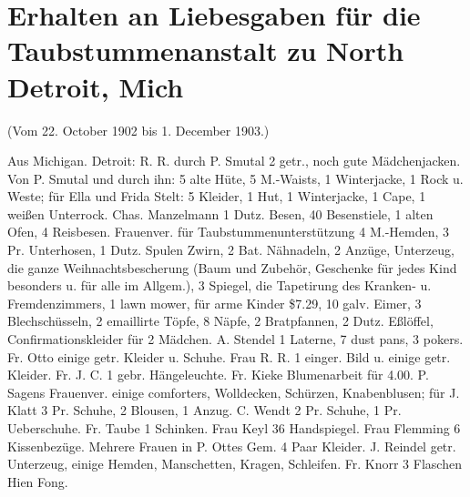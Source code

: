 \chapter[Liebesgaben für die Taubstummenanstalt]{Erhalten an Liebesgaben für die Taubstummenanstalt zu North Detroit, Mich}

(Vom 22. October 1902 bis 1. December 1903.)

Aus Michigan. Detroit: R. R. durch P. Smutal 2 getr., noch gute Mädchenjacken. Von P. Smutal und durch ihn: 5 alte Hüte, 5 M.-Waists, 1 Winterjacke, 1 Rock u. Weste; für Ella und Frida Stelt: 5 Kleider, 1 Hut, 1 Winterjacke, 1 Cape, 1 weißen Unterrock. Chas. Manzelmann 1 Dutz. Besen, 40 Besenstiele, 1 alten Ofen, 4 Reisbesen. Frauenver. für Taubstummenunterstützung 4 M.-Hemden, 3 Pr. Unterhosen, 1 Dutz. Spulen Zwirn, 2 Bat. Nähnadeln, 2 Anzüge, Unterzeug, die ganze Weihnachtsbescherung (Baum und Zubehör, Geschenke für jedes Kind besonders u. für alle im Allgem.), 3 Spiegel, die Tapetirung des Kranken- u. Fremdenzimmers, 1 lawn mower, für arme Kinder \$7.29, 10 galv. Eimer, 3 Blechschüsseln, 2 emaillirte Töpfe, 8 Näpfe, 2 Bratpfannen, 2 Dutz. Eßlöffel, Confirmationskleider für 2 Mädchen. A. Stendel 1 Laterne, 7 dust pans, 3 pokers. Fr. Otto einige getr. Kleider u. Schuhe. Frau R. R. 1 einger. Bild u. einige getr. Kleider. Fr. J. C. 1 gebr. Hängeleuchte. Fr. Kieke Blumenarbeit für 4.00. P. Sagens Frauenver. einige comforters, Wolldecken, Schürzen, Knabenblusen; für J. Klatt 3 Pr. Schuhe, 2 Blousen, 1 Anzug. C. Wendt 2 Pr. Schuhe, 1 Pr. Ueberschuhe. Fr. Taube 1 Schinken. Frau Keyl 36 Handspiegel. Frau Flemming 6 Kissenbezüge. Mehrere Frauen in P. Ottes Gem. 4 Paar Kleider. J. Reindel getr. Unterzeug, einige Hemden, Manschetten, Kragen, Schleifen. Fr. Knorr 3 Flaschen Hien Fong.

